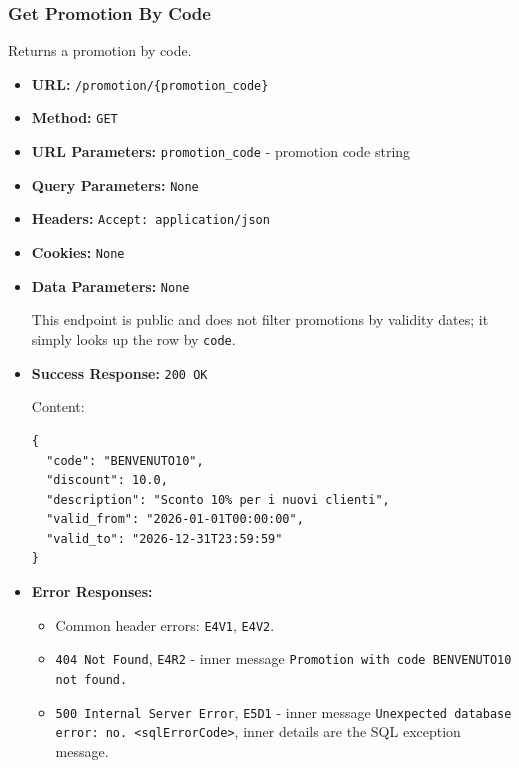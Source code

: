 \subsubsection*{Get Promotion By Code}

Returns a promotion by code.

\begin{itemize}[nosep]
\item \textbf{URL:} \texttt{/promotion/\{promotion\_code\}}

\item \textbf{Method:} \texttt{GET}

\item \textbf{URL Parameters:} \texttt{promotion\_code} - promotion code string

\item \textbf{Query Parameters:} \texttt{None}

\item \textbf{Headers:} \texttt{Accept: application/json}

\item \textbf{Cookies:} \texttt{None}

\item \textbf{Data Parameters:} \texttt{None}

This endpoint is public and does not filter promotions by validity dates; it simply looks up the row by \texttt{code}.

\item \textbf{Success Response:} \texttt{200 OK}

Content:

\begin{lstlisting}
{
  "code": "BENVENUTO10",
  "discount": 10.0,
  "description": "Sconto 10% per i nuovi clienti",
  "valid_from": "2026-01-01T00:00:00",
  "valid_to": "2026-12-31T23:59:59"
}
\end{lstlisting}

\item \textbf{Error Responses:}

\begin{itemize}[nosep]
\item Common header errors: \texttt{E4V1}, \texttt{E4V2}.
\item \texttt{404 Not Found}, \texttt{E4R2} - inner message \texttt{Promotion with code BENVENUTO10 not found.}
\item \texttt{500 Internal Server Error}, \texttt{E5D1} - inner message \texttt{Unexpected database error: no. <sqlErrorCode>}, inner details are the SQL exception message.
\end{itemize}

\end{itemize}

